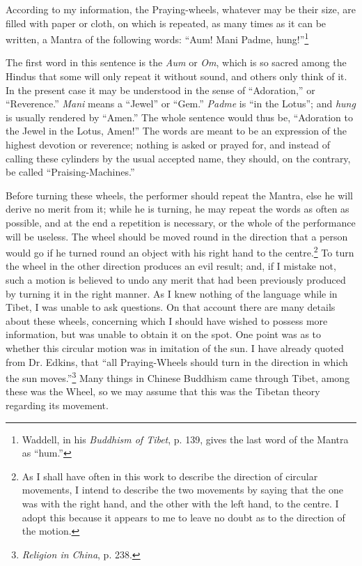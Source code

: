\documentclass[a4paper, 11pt, oneside, polutonikogreek, english]{article}
\begin{document}
According to my information, the Praying-wheels, whatever may be their size, are filled with paper or cloth, on which is repeated, as many times as it can be written, a Mantra of the following words: ``Aum! Mani Padme, hung!''\footnote{Waddell, in his \emph{Buddhism of Tibet}, p. 139, gives the last word of the Mantra as ``hum.''}

The first word in this sentence is the \emph{Aum} or \emph{Om}, which is so sacred among the Hindus that some will only repeat it without sound, and others only think of it. In the present case it may be understood in the sense of ``Adoration,'' or ``Reverence.'' \emph{Mani} means a ``Jewel'' or ``Gem.'' \emph{Padme} is ``in the Lotus''; and \emph{hung} is usually rendered by ``Amen.'' The whole sentence would thus be, ``Adoration to the Jewel in the Lotus, Amen!'' The words are meant to be an expression of the highest devotion or reverence; nothing is asked or prayed for, and instead of calling these cylinders by the usual accepted name, they should, on the contrary, be called ``Praising-Machines.''

Before turning these wheels, the performer should repeat the Mantra, else he will derive no merit from it; while he is turning, he may repeat the words as often as possible, and at the end a repetition is necessary, or the whole of the performance will be useless. The wheel should be moved round in the direction that a person would go if he turned round an object with his right hand to the centre.\footnote{As I shall have often in this work to describe the direction of circular movements, I intend to describe the two movements by saying that the one was with the right hand, and the other  with the left hand, to the centre. I adopt this because it appears to me to leave no doubt as to the direction of the motion.} To turn the wheel in the other direction produces an evil result; and, if I mistake not, such a motion is believed to undo any merit that had been previously produced by turning it in the right manner. As I knew nothing of the language while in Tibet, I was unable to ask questions. On that account there are many details about these wheels, concerning which I should have wished to possess more information, but was unable to obtain it on the spot. One point was as to whether this circular motion was in imitation of the sun. I have already quoted from Dr. Edkins, that ``all Praying-Wheels should turn in the direction in which the sun moves.''\footnote{\emph{Religion in China}, p. 238.} Many things in Chinese Buddhism came through Tibet, among these was the Wheel, so we may assume that this was the Tibetan theory regarding its movement.
\end{document}
